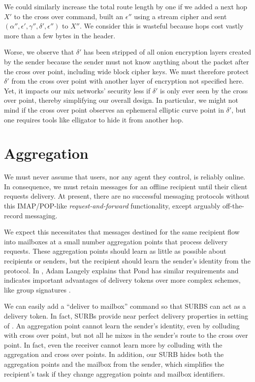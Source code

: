 \documentclass[twoside,letterpaper]{llncs}
\begin{document}
We could similarly increase the total route length by one if
we added a next hop $X'$ to the cross over command, built an
$\epsilon''$ using a stream cipher and sent
 $(\alpha'',\epsilon',\gamma'',\delta',\epsilon'')$ to $X''$.
We consider this is wasteful because hops cost vastly more than
a few bytes in the header.  

Worse, we observe that $\delta'$ has been stripped of all onion
encryption layers created by the sender because the sender must not
know anything about the packet after the cross over point,
 including wide block cipher keys.
We must therefore protect $\delta'$ from the cross over point with
another layer of encryption not specified here.  Yet, it impacts our
mix networks' security less if $\delta'$ is only ever seen by the
cross over point, thereby simplifying our overall design.  
In particular, we might not mind if the cross over point observes an
ephemeral elliptic curve point in $\delta'$, but one requires tools
like elligator \cite{elligator} to hide it from another hop.


\section{Aggregation}

We must never assume that users, nor any agent they control, is
reliably online.  
In consequence, we must retain messages for an offline recipient
until their client requests delivery.  
At present, there are no successful messaging protocols without
this IMAP/POP-like {\em request-and-forward} functionality, except
arguably off-the-record messaging. 

We expect this necessitates that messages destined for the same
recipient flow into mailboxes at a small number aggregation points
that process delivery requests.  These aggregation points should
learn as little as possible about recipients or senders, but the
recipient should learn the sender's identity from the protocol.
In \cite{agl-pond-hmac}, Adam Langely explains that Pond has similar
requirements and indicates important advantages of delivery tokens
over more complex schemes, like group signatures \cite{VLR,BBS}.

We can easily add a ``deliver to mailbox'' command so that SURBS
can act as a delivery token.  In fact, SURBs provide near perfect
delivery properties in setting of \cite{warner-delivery}.
An aggregation point cannot learn the sender's identity, even 
by colluding with cross over point, but not all he mixes in the 
sender's route to the cross over point.  
In fact, even the receiver cannot learn more by colluding with
the aggregation and cross over points.  In addition, our SURB
hides both the aggregation points and the mailbox from the sender,
which simplifies the recipient's task if they change aggregation
points and mailbox identifiers.
\end{document}
